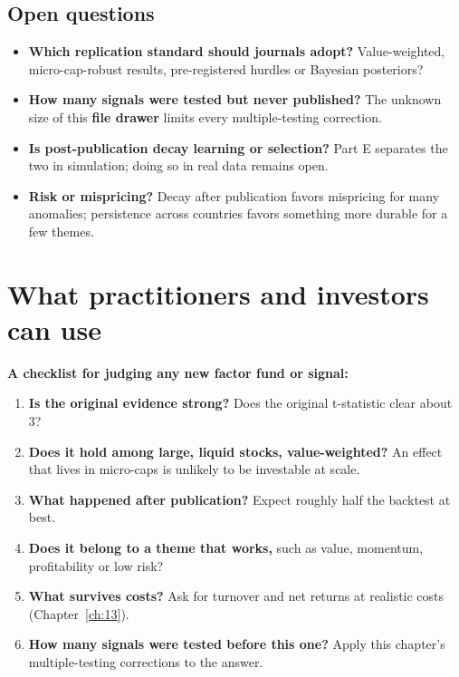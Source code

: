 \subsection{Open questions}
\label{sec:19-open}

\begin{itemize}
  \item \textbf{Which replication standard should journals adopt?} Value-weighted, micro-cap-robust results, pre-registered hurdles or Bayesian posteriors?
  \item \textbf{How many signals were tested but never published?} The unknown size of this \textbf{file drawer} limits every multiple-testing correction.
  \item \textbf{Is post-publication decay learning or selection?} Part E separates the two in simulation; doing so in real data remains open.
  \item \textbf{Risk or mispricing?} Decay after publication favors mispricing for many anomalies; persistence across countries favors something more durable for a few themes.
\end{itemize}

\section{What practitioners and investors can use}
\label{sec:19-investors}

\textbf{A checklist for judging any new factor fund or signal:}

\begin{enumerate}
  \item \textbf{Is the original evidence strong?} Does the original t-statistic clear about 3?
  \item \textbf{Does it hold among large, liquid stocks, value-weighted?} An effect that lives in micro-caps is unlikely to be investable at scale.
  \item \textbf{What happened after publication?} Expect roughly half the backtest at best.
  \item \textbf{Does it belong to a theme that works,} such as value, momentum, profitability or low risk?
  \item \textbf{What survives costs?} Ask for turnover and net returns at realistic costs (Chapter~\ref{ch:13}).
  \item \textbf{How many signals were tested before this one?} Apply this chapter's multiple-testing corrections to the answer.
\end{enumerate}

